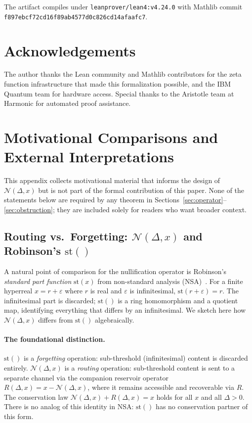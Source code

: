 \documentclass[12pt, a4paper]{article}
\theoremstyle{plain}
\theoremstyle{definition}
\newcommand{\N}{\mathcal{N}}
\newcommand{\Aristotle}{\textsf{Aristotle}}
\begin{document}
The artifact compiles under \texttt{leanprover/lean4:v4.24.0}
with Mathlib commit \texttt{f897ebcf72cd16f89ab4577d0c826cd14afaafc7}.

\section*{Acknowledgements}

The author thanks the Lean community and Mathlib contributors for the
zeta function infrastructure that made this formalization possible,
and the IBM Quantum team for hardware access.
Special thanks to the \Aristotle{} team at Harmonic for automated proof
assistance.

\appendix

\section{Motivational Comparisons and External Interpretations}
\label{app:motivation}

This appendix collects motivational material that informs the design of
$\N(\Delta, x)$ but is not part of the formal contribution of this paper.
None of the statements below are required by any theorem in
Sections~\ref{sec:operator}--\ref{sec:obstruction}; they are included
solely for readers who want broader context.

\subsection{Routing vs.\ Forgetting: $\N(\Delta,x)$ and Robinson's $\mathrm{st}()$}
\label{app:routing}

A natural point of comparison for the nullification operator is
Robinson's \emph{standard part function} $\mathrm{st}(x)$ from
non-standard analysis (NSA)~\cite{robinson1966}.
For a finite hyperreal $x = r + \varepsilon$ where $r$ is real and
$\varepsilon$ is infinitesimal, $\mathrm{st}(r + \varepsilon) = r$.
The infinitesimal part is discarded; $\mathrm{st}()$ is a ring
homomorphism and a quotient map, identifying everything that differs by
an infinitesimal.
We sketch here how $\N(\Delta, x)$ differs from $\mathrm{st}()$
algebraically.

\paragraph{The foundational distinction.}
$\mathrm{st}()$ is a \emph{forgetting} operation: sub-threshold
(infinitesimal) content is discarded entirely.
$\N(\Delta, x)$ is a \emph{routing} operation: sub-threshold content is
sent to a separate channel via the companion reservoir operator
$R(\Delta, x) = x - \N(\Delta, x)$, where it remains accessible and
recoverable via $R$.
The conservation law $\N(\Delta, x) + R(\Delta, x) = x$ holds for all
$x$ and all $\Delta > 0$.
There is no analog of this identity in NSA: $\mathrm{st}()$ has no
conservation partner of this form.
\end{document}
